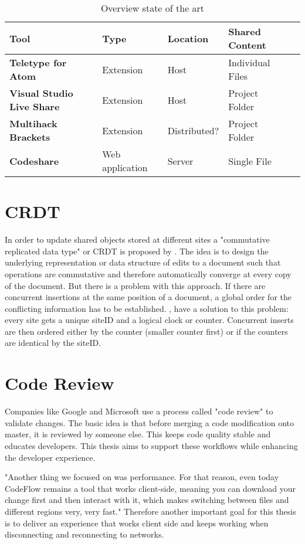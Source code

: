\begin{table}
	\centering
	\begin{tabular}{| >{\bfseries}l | l | l | l | l | }
		\hline
			\rowcolor{orange} \bfseries Tool & \bfseries Type & \bfseries Location & \bfseries Shared Content \\
		\hline
		\hline
			Teletype for Atom & Extension & Host & Individual Files \\\hline
			Visual Studio Live Share & Extension & Host & Project Folder \\\hline
			Multihack Brackets & Extension &  Distributed? & Project Folder \\\hline
			Codeshare & Web application & Server & Single File \\
		\hline
	\end{tabular}
	\caption{Overview state of the art}
	\label{tab:sota}
\end{table}

\section{CRDT}
In order to update shared objects stored at different sites a "commutative replicated data type" or CRDT is proposed by \cite{PreguicaMarquesShapiroLetia:2009}. The idea is to design the underlying representation or data structure of edits to a document such that operations are commutative and therefore automatically converge at every copy of the document.
But there is a problem with this approach. If there are concurrent insertions at the same position of a document, a global order for the conflicting information has to be established. \cite{PreguicaMarquesShapiroLetia:2009},\cite{Oster:2006:DataconsistencyforP2Pcollaborativeediting} have a solution to this problem: every site gets a unique siteID and a logical clock or counter. Concurrent inserts are then ordered either by the counter (smaller counter first) or if the counters are identical by the siteID.

\section{Code Review}

Companies like Google and Microsoft use a process called "code review" to validate changes. The basic idea is that before merging a code modification onto master, it is reviewed by someone else. This keeps code quality stable and educates developers.\cite{SadowskiSoederbergChurchSipkoBacchelli:2018:Moderncodereview:acasestudyatgoogle} This thesis aims to support these workflows while enhancing the developer experience. 

"Another thing we focused on was performance. For that
reason, even today CodeFlow remains a tool that works
client-side, meaning you can download your change first
and then interact with it, which makes switching between
files and different regions very, very fast."\cite{CzerwonkaGreilerBirdPanjerCoatta:2018:CodeFlow:ImprovingtheCodeReviewProcessatMicrosoft} Therefore another important goal for this thesis is to deliver an experience that works client side and keeps working when disconnecting and reconnecting to networks.